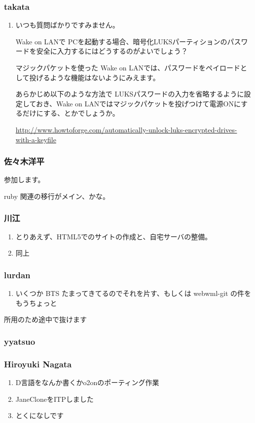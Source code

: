 \documentclass[cjk,dvipdfmx,10pt,compress,%
hyperref={bookmarks=true,bookmarksnumbered=true,bookmarksopen=false,%
colorlinks=false,%
pdftitle={第 84 回 関西 Debian 勉強会},%
pdfauthor={倉敷・のがた・佐々木・かわだ・八津尾},%
pdfsubject={資料},%
}]{beamer}
\begin{document}
\begin{frame}
  \frametitle{ takata }
  \begin{enumerate}
  \item いつも質問ばかりですみません。

    Wake on LANで PCを起動する場合、暗号化LUKSパーティションのパスワードを安全に入力するにはどうするのがよいでしょう？

    マジックパケットを使った Wake on LANでは、パスワードをペイロードとして投げるような機能はないようにみえます。

    あらかじめ以下のような方法で LUKSパスワードの入力を省略するように設定しておき、Wake on LANではマジックパケットを投げつけて電源ONにするだけにする、とかでしょうか。

    \url{http://www.howtoforge.com/automatically-unlock-luks-encrypted-drives-with-a-keyfile}
  \end{enumerate}
\end{frame}

\begin{frame}
  \frametitle{ 佐々木洋平 }
  参加します。

  ruby 関連の移行がメイン、かな。
\end{frame}

\begin{frame}
  \frametitle{ 川江 }
  \begin{enumerate}
  \item とりあえず、HTML5でのサイトの作成と、自宅サーバの整備。
  \item 同上
  \end{enumerate}
\end{frame}

\begin{frame}
  \frametitle{ lurdan }
  \begin{enumerate}
  \item いくつか BTS たまってきてるのでそれを片す、もしくは webwml-git の件をもうちょっと
  \end{enumerate}

  所用のため途中で抜けます
\end{frame}

\begin{frame}
  \frametitle{ yyatsuo }
\end{frame}

\begin{frame}
  \frametitle{ Hiroyuki Nagata }
  \begin{enumerate}
  \item D言語をなんか書くかo2onのポーティング作業
  \item JaneCloneをITPしました
  \item とくになしです
  \end{enumerate}
\end{frame}
\end{document}

